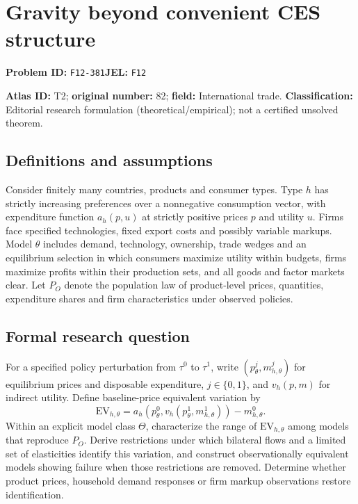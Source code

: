 \documentclass[11pt,a4paper]{article}
\begin{document}
\section*{Gravity beyond convenient CES structure}
\textbf{Problem ID:} \texttt{F12-381}\quad \textbf{JEL:} \texttt{F12}\par
\label{problem:OP-0082}
\label{atlas:prob:T2}

\noindent\textbf{Atlas ID:} T2; \textbf{original number:} 82; \textbf{field:} International trade. \textbf{Classification:} Editorial research formulation (theoretical/empirical); not a certified unsolved theorem.

\subsection*{Definitions and assumptions}
Consider finitely many countries, products and consumer types. Type $h$ has strictly increasing preferences over a nonnegative consumption vector, with expenditure function $a_h(p,u)$ at strictly positive prices $p$ and utility $u$. Firms face specified technologies, fixed export costs and possibly variable markups. Model $\theta$ includes demand, technology, ownership, trade wedges and an equilibrium selection in which consumers maximize utility within budgets, firms maximize profits within their production sets, and all goods and factor markets clear. Let $P_O$ denote the population law of product-level prices, quantities, expenditure shares and firm characteristics under observed policies.

\subsection*{Formal research question}
For a specified policy perturbation from $\tau^0$ to $\tau^1$, write $(p^j_\theta,m^j_{h,\theta})$ for equilibrium prices and disposable expenditure, $j\in\{0,1\}$, and $v_h(p,m)$ for indirect utility. Define baseline-price equivalent variation by
\[
 \mathrm{EV}_{h,\theta}
 =a_h(p^0_\theta,v_h(p^1_\theta,m^1_{h,\theta}))-m^0_{h,\theta}.
\]
Within an explicit model class $\Theta$, characterize the range of $\mathrm{EV}_{h,\theta}$ among models that reproduce $P_O$. Derive restrictions under which bilateral flows and a limited set of elasticities identify this variation, and construct observationally equivalent models showing failure when those restrictions are removed. Determine whether product prices, household demand responses or firm markup observations restore identification.
\end{document}
